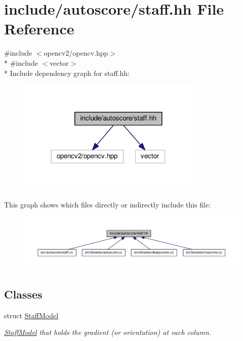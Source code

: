 \hypertarget{staff_8hh}{}\section{include/autoscore/staff.hh File Reference}
\label{staff_8hh}
{\ttfamily \#include $<$opencv2/opencv.\+hpp$>$}\\*
{\ttfamily \#include $<$vector$>$}\\*
Include dependency graph for staff.\+hh\+:\nopagebreak
\begin{figure}[H]
\begin{center}
\leavevmode
\includegraphics[width=249pt]{staff_8hh__incl}
\end{center}
\end{figure}
This graph shows which files directly or indirectly include this file\+:\nopagebreak
\begin{figure}[H]
\begin{center}
\leavevmode
\includegraphics[width=350pt]{staff_8hh__dep__incl}
\end{center}
\end{figure}
\subsection*{Classes}
\begin{DoxyCompactItemize}
\item 
struct \hyperlink{structStaffModel}{Staff\+Model}
\begin{DoxyCompactList}\small\item\em \hyperlink{structStaffModel}{Staff\+Model} that holds the gradient (or orientation) at each column. \end{DoxyCompactList}\end{DoxyCompactItemize}
